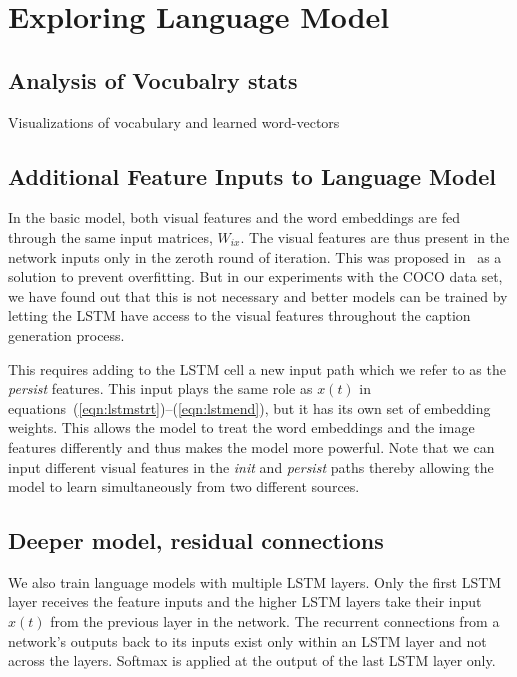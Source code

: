 \chapter{Exploring Language Model}
\label{chapter:langModel}
\section{Analysis of Vocubalry stats}
Visualizations of vocabulary and learned word-vectors

\section{Additional Feature Inputs to Language Model}

In the basic model, both visual features and the word embeddings are fed through
the same input matrices, $W_{ix}$.
The visual features are thus present in the network inputs only in the zeroth
round of iteration.
This was proposed in~\cite{Vinyals_2015_CVPR} as a solution to prevent
overfitting. 
But in our experiments with the COCO data set, we have found out that this is
not necessary and better models can be trained by letting the LSTM have access
to the visual features throughout the caption generation process.

This requires adding to the LSTM cell a new input path which we refer to as the
\emph{persist} features.
This input plays the same role as $x(t)$ in
equations~(\ref{eqn:lstmstrt})--(\ref{eqn:lstmend}), but it has its own set of
embedding weights.
This allows the model to treat the word embeddings and the image features
differently and thus makes the model more powerful.
Note that we can input different visual features in the \emph{init} and
\emph{persist} paths thereby allowing the model to learn simultaneously from two
different sources.

\section{Deeper model, residual connections }
We also train language models with multiple LSTM layers.
Only the first LSTM layer receives the feature inputs and the higher LSTM layers
take their input $x(t)$ from the previous layer in the network.
The recurrent connections from a network's outputs back to its inputs exist only
within an LSTM layer and not across the layers.
Softmax is applied at the output of the last LSTM layer only.

